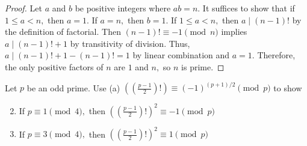 \documentclass{ximera}
\begin{document}
\begin{proof}
    Let $a$ and $b$ be positive integers where $ab=n.$ It suffices to show that if $1\leq a < n,$ then $a=1.$ If $a=n,$ then $b=1.$ If  $1\leq a < n,$ then $a\mid (n-1)!$ by the definition of factorial. Then $(n-1)!\equiv -1\pmod{n}$ implies $a\mid (n-1)!+1$ by transitivity of division. Thus, $a\mid (n-1)!+1-(n-1)!=1$ by linear combination and $a=1.$ Therefore, the only positive factors of $n$ are $1$ and $n,$ so $n$ is prime.
\end{proof}


\begin{br}
    Let $p$ be an odd prime. Use (a) $\left(\left(\frac{p-1}{2}\right)!\right)\equiv (-1)^{(p+1)/2} \pmod{p}$ to show
    \begin{enumerate}[label=(\alph*)]
        \setcounter{enumi}{1}
        \item If $p\equiv 1\pmod{4},$ then $\left(\left(\frac{p-1}{2}\right)!\right)^2\equiv -1 \pmod{p}$
        
        \item If $p\equiv 3\pmod{4},$ then $\left(\left(\frac{p-1}{2}\right)!\right)^2\equiv 1 \pmod{p}$
    \end{enumerate}


\end{br}



\end{document}
